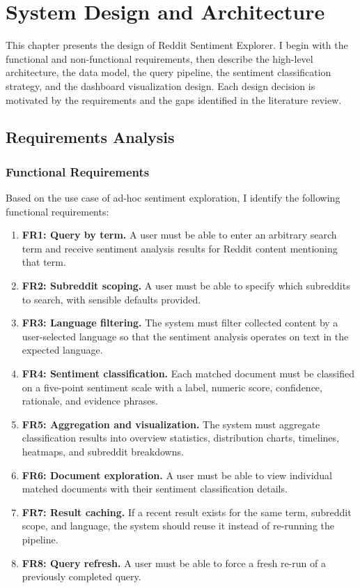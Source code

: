 \chapter{System Design and Architecture}
\label{ch:system_design}

\begin{sloppypar}
This chapter presents the design of Reddit Sentiment Explorer. I begin with the functional and non-functional requirements, then describe the high-level architecture, the data model, the query pipeline, the sentiment classification strategy, and the dashboard visualization design. Each design decision is motivated by the requirements and the gaps identified in the literature review.
\end{sloppypar}

\section{Requirements Analysis}
\label{sec:requirements}

\subsection{Functional Requirements}

Based on the use case of ad-hoc sentiment exploration, I identify the following functional requirements:

\begin{enumerate}
    \item \textbf{FR1: Query by term.} A user must be able to enter an arbitrary search term and receive sentiment analysis results for Reddit content mentioning that term.
    \item \textbf{FR2: Subreddit scoping.} A user must be able to specify which subreddits to search, with sensible defaults provided.
    \item \textbf{FR3: Language filtering.} The system must filter collected content by a user-selected language so that the sentiment analysis operates on text in the expected language.
    \item \textbf{FR4: Sentiment classification.} Each matched document must be classified on a five-point sentiment scale with a label, numeric score, confidence, rationale, and evidence phrases.
    \item \textbf{FR5: Aggregation and visualization.} The system must aggregate classification results into overview statistics, distribution charts, timelines, heatmaps, and sub\-reddit breakdowns.
    \item \textbf{FR6: Document exploration.} A user must be able to view individual matched documents with their sentiment classification details.
    \item \textbf{FR7: Result caching.} If a recent result exists for the same term, subreddit scope, and language, the system should reuse it instead of re-running the pipeline.
    \item \textbf{FR8: Query refresh.} A user must be able to force a fresh re-run of a previously completed query.
\end{enumerate}

